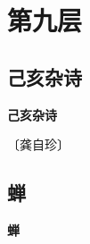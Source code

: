 \documentclass[12pt,UTF-8,openany,fontset=none]{ctexbook}
\begin{document}
\vspace{8pt}
\clearpage

\chapter{第九层}
\clearpage

\section{己亥杂诗}



\begin{center}
    {\bfseries 己亥杂诗}
\end{center}

\begin{center}
    \vspace{10pt}
    
    \begin{large}
        
        〔龚自珍〕
        
    \end{large}
    
    \vspace{8pt}
    
    \begin{huge}
        
        \phantom{。}

        \phantom{。}
        
        \phantom{。}

        \phantom{。}
        
    \end{huge}
    
\end{center}

\vspace{8pt}
\clearpage

\section{蝉}



\begin{center}
    {\bfseries 蝉}
\end{center}
\end{document}
